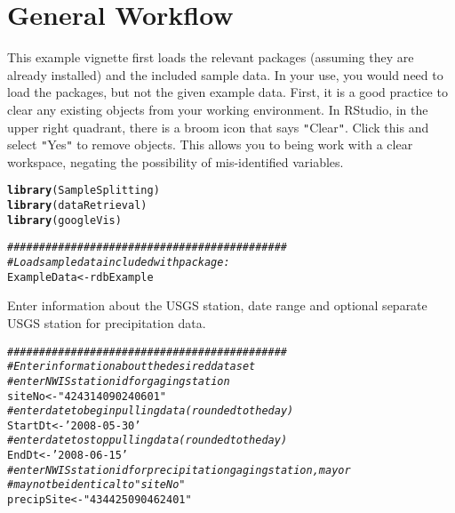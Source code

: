 \documentclass[a4paper,11pt]{article}\usepackage[]{graphicx}\usepackage[]{color}
\makeatletter
\newcommand{\hlstr}[1]{\textcolor[rgb]{0.192,0.494,0.8}{#1}}%
\newcommand{\hlcom}[1]{\textcolor[rgb]{0.678,0.584,0.686}{\textit{#1}}}%
\newcommand{\hlstd}[1]{\textcolor[rgb]{0.345,0.345,0.345}{#1}}%
\newcommand{\hlkwb}[1]{\textcolor[rgb]{0.69,0.353,0.396}{#1}}%
\newcommand{\hlkwd}[1]{\textcolor[rgb]{0.737,0.353,0.396}{\textbf{#1}}}%
\newenvironment{kframe}{%
 \def\at@end@of@kframe{}%
 \ifinner\ifhmode%
  \def\at@end@of@kframe{\end{minipage}}%
  \begin{minipage}{\columnwidth}%
 \fi\fi%
 \def\FrameCommand##1{\hskip\@totalleftmargin \hskip-\fboxsep
 \colorbox{shadecolor}{##1}\hskip-\fboxsep
     \hskip-\linewidth \hskip-\@totalleftmargin \hskip\columnwidth}%
 \MakeFramed {\advance\hsize-\width
   \@totalleftmargin\z@ \linewidth\hsize
   \@setminipage}}%
 {\par\unskip\endMakeFramed%
 \at@end@of@kframe}
\newenvironment{knitrout}{}{} %
\makeatother
\begin{document}
\section{General Workflow}
\label{sec:genWorkflow}

This example vignette first loads the relevant packages (assuming they are already installed) and the included sample data. In your use, you would need to load the packages, but not the given example data.
First, it is a good practice to clear any existing objects from your working environment. In RStudio, in the upper right quadrant, there is a broom icon that says \texttt{"}Clear\texttt{"}. Click this and select \texttt{"}Yes\texttt{"} to remove objects. This allows you to being work with a clear workspace, negating the possibility of mis-identified variables. 

\begin{knitrout}
\color{fgcolor}\begin{kframe}
\begin{alltt}
\hlkwd{library}\hlstd{(SampleSplitting)}
\hlkwd{library}\hlstd{(dataRetrieval)}
\hlkwd{library}\hlstd{(googleVis)}

\hlcom{############################################}
\hlcom{# Load sample data included with package:}
\hlstd{ExampleData} \hlkwb{<-} \hlstd{rdbExample}
\end{alltt}
\end{kframe}
\end{knitrout}

Enter information about the USGS station, date range and optional separate USGS station for precipitation data.

\begin{knitrout}
\color{fgcolor}\begin{kframe}
\begin{alltt}
\hlcom{############################################}
\hlcom{# Enter information about the desired data set}
\hlcom{# enter NWIS station id for gaging station}
\hlstd{siteNo} \hlkwb{<-} \hlstr{"424314090240601"}
\hlcom{# enter date to begin pulling data (rounded to the day)}
\hlstd{StartDt} \hlkwb{<-} \hlstr{'2008-05-30'}
\hlcom{# enter date to stop pulling data (rounded to the day)}
\hlstd{EndDt} \hlkwb{<-} \hlstr{'2008-06-15'}
\hlcom{# enter NWIS station id for precipitation gaging station, may or }
\hlcom{# may not be identical to "siteNo"}
\hlstd{precipSite} \hlkwb{<-} \hlstr{"434425090462401"}
\end{alltt}
\end{kframe}
\end{knitrout}
\end{document}

